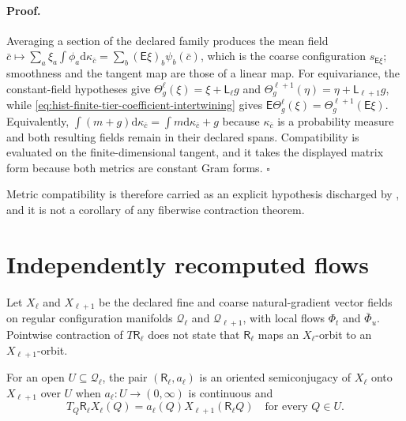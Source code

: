 \paragraph{Proof.}
Averaging a section of the declared family produces the mean field
$\bar c\mapsto\sum_a\xi_a\int\phi_a\mathrm d\kappa_{\bar c}
=\sum_b(\mathsf E\xi)_b\psi_b(\bar c)$, which is the coarse
  configuration $s_{\mathsf E\xi}$; smoothness and the tangent map are those of
  a linear map.  For equivariance, the constant-field hypotheses give
  $\Theta^\ell_g(\xi)=\xi+\mathsf L_\ell g$ and
  $\Theta^{\ell+1}_g(\eta)=\eta+\mathsf L_{\ell+1}g$, while
  \eqref{eq:hist-finite-tier-coefficient-intertwining} gives
  $\mathsf E\Theta^\ell_g(\xi)=\Theta^{\ell+1}_g(\mathsf E\xi)$.
  Equivalently, $\int(m+g)\mathrm d\kappa_{\bar c}=\int m\mathrm
  d\kappa_{\bar c}+g$ because $\kappa_{\bar c}$ is a probability measure and
  both resulting fields remain in their declared spans.  Compatibility is
 evaluated on the finite-dimensional tangent,
and it takes the displayed matrix form because both metrics are constant Gram
forms.  $\square$

Metric compatibility is therefore carried as an explicit hypothesis discharged
by , and it is not a corollary of any fiberwise
contraction theorem.  

\section{Independently recomputed flows}
\label{sec:hist-independent-flows}

Let $X_\ell$ and $X_{\ell+1}$ be the declared fine and coarse natural-gradient
vector fields on regular configuration manifolds $\mathcal Q_\ell$ and
$\mathcal Q_{\ell+1}$, with local flows $\Phi_t$ and $\bar\Phi_u$.  Pointwise
contraction of $T\mathsf R_\ell$ does not state that $\mathsf R_\ell$ maps an
$X_\ell$-orbit to an $X_{\ell+1}$-orbit.  

For an open $U\subseteq\mathcal Q_\ell$, the pair $(\mathsf R_\ell,a_\ell)$ is
an oriented semiconjugacy of $X_\ell$ onto $X_{\ell+1}$ over $U$ when
$a_\ell:U\to(0,\infty)$ is continuous and
\begin{equation}
T_Q\mathsf R_\ell X_\ell(Q)
=a_\ell(Q)X_{\ell+1}(\mathsf R_\ell Q)
\quad\text{for every }Q\in U.
\label{eq:hist-oriented-vector-field-semiconjugacy}
\end{equation}

